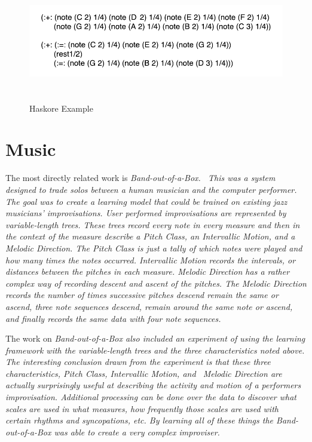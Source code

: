 \documentclass[12pt]{ucthesis}
\newcommand{\captionfonts}{\small\bf\ssp}
\begin{document}
\begin{figure}
\includegraphics[height=45mm]{haskore-example.pdf}
\captionfonts
\caption[Haskore Example]{Haskore Example}
\label{fig:haskore-example}
\end{figure}

\section{Music}
\label{rw:music}
The most directly related work is \em{Band-out-of-a-Box}\em.~\cite{bob} This was a system designed to trade solos between a human musician and the computer performer. The goal was to create a learning model that could be trained on existing jazz musicians' improvisations. User performed improvisations are represented by variable-length trees. These trees record every note in every measure and then in the context of the measure describe a \em{Pitch Class, }\em an \em{Intervallic Motion, }\em and a \em{Melodic Direction. }\em The \em{Pitch Class }\em is just a tally of which notes were played and how many times the notes occurred. \em{Intervallic Motion }\em records the intervals, or distances between the pitches in each measure.  \em{Melodic Direction }\em has a rather complex way of recording descent and ascent of the pitches.  The \em{Melodic Direction }\em records the number of times successive pitches descend remain the same or ascend, three note sequences descend, remain around the same note or ascend, and finally records the same data with four note sequences. 

The work on \em{Band-out-of-a-Box }\em also included an experiment of using the learning framework with the variable-length trees and the three characteristics noted above. The interesting conclusion drawn from the experiment is that these three characteristics, \em{Pitch Class, Intervallic Motion, }\em and  ~\em{Melodic Direction }\em are actually surprisingly useful at describing the activity and motion of a performers improvisation. Additional processing can be done over the data to discover what scales are used in what measures, how frequently those scales are used with certain rhythms and syncopations, etc. By learning all of these things the \em{Band-out-of-a-Box }\em was able to create a very complex improviser.
\end{document}
